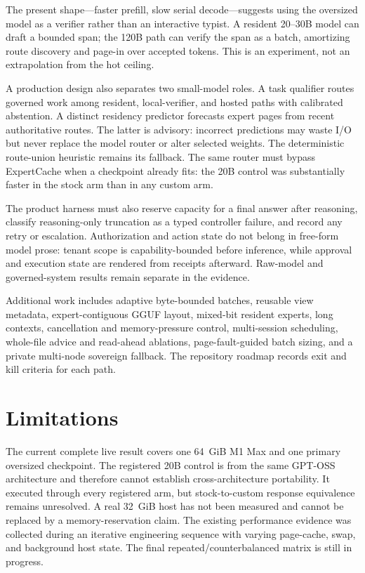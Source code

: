 \documentclass[10pt,twocolumn]{article}
\begin{document}
The present shape---faster prefill, slow serial decode---suggests using the
oversized model as a verifier rather than an interactive typist.  A resident
20--30B model can draft a bounded span; the 120B path can verify the span as a
batch, amortizing route discovery and page-in over accepted tokens.  This is
an experiment, not an extrapolation from the hot ceiling.

A production design also separates two small-model roles.  A task qualifier
routes governed work among resident, local-verifier, and hosted paths with
calibrated abstention.  A distinct residency predictor forecasts expert pages
from recent authoritative routes.  The latter is advisory: incorrect
predictions may waste I/O but never replace the model router or alter selected
weights.  The deterministic route-union heuristic remains its fallback.
The same router must bypass ExpertCache when a checkpoint already fits: the
20B control was substantially faster in the stock arm than in any custom arm.

The product harness must also reserve capacity for a final answer after
reasoning, classify reasoning-only truncation as a typed controller failure,
and record any retry or escalation.  Authorization and action state do not
belong in free-form model prose: tenant scope is capability-bounded before
inference, while approval and execution state are rendered from receipts
afterward.  Raw-model and governed-system results remain separate in the
evidence.

Additional work includes adaptive byte-bounded batches, reusable view
metadata, expert-contiguous GGUF layout, mixed-bit resident experts, long
contexts, cancellation and memory-pressure control, multi-session scheduling,
whole-file advice and read-ahead ablations, page-fault-guided batch sizing,
and a private multi-node sovereign fallback.  The repository roadmap records
exit and kill criteria for each path.

\section{Limitations}

The current complete live result covers one 64~GiB M1 Max and one primary
oversized checkpoint.  The registered 20B control is from the same GPT-OSS
architecture and therefore cannot establish cross-architecture portability.
It executed through every registered arm, but stock-to-custom response
equivalence remains unresolved.
A real 32~GiB host has not been measured and cannot be replaced by a
memory-reservation claim.  The existing performance evidence was collected
during an iterative engineering sequence with varying page-cache, swap, and
background host state.  The final repeated/counterbalanced matrix is still in
progress.
\end{document}
